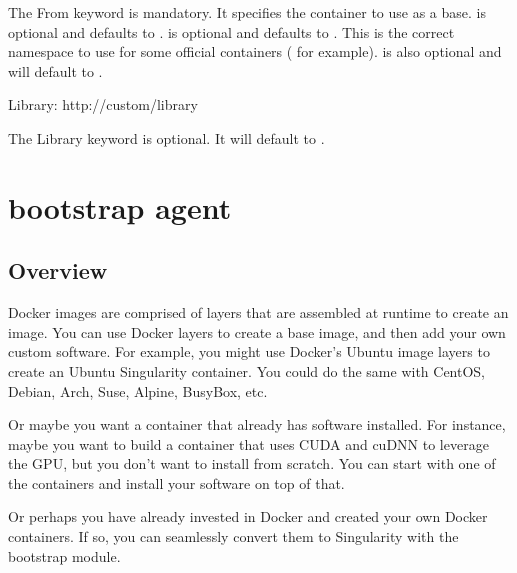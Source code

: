 \documentclass[letterpaper,10pt,english]{sphinxmanual}
\begin{document}
The From keyword is mandatory. It specifies the container to use as a base.
 is optional and defaults to .  is
optional and defaults to . This is the correct namespace to use for
some official containers ( for example).  is also optional and
will default to .

%
\begin{sphinxVerbatim}[commandchars=\\\{\}]
Library: http://custom/library
\end{sphinxVerbatim}

The Library keyword is optional. It will default to
.


\section{ bootstrap agent}
\label{\detokenize{appendix:docker-bootstrap-agent}}\label{\detokenize{appendix:build-docker-module}}

\subsection{Overview}
\label{\detokenize{appendix:sec-build-docker-module}}\label{\detokenize{appendix:id1}}
Docker images are comprised of layers that are assembled at runtime to create an
image. You can use Docker layers to create a base image, and then add your own
custom software. For example, you might use Docker’s Ubuntu image layers to
create an Ubuntu Singularity container. You could do the same with CentOS,
Debian, Arch, Suse, Alpine, BusyBox, etc.

Or maybe you want a container that already has software installed. For instance,
maybe you want to build a container that uses CUDA and cuDNN to leverage the
GPU, but you don’t want to install from scratch. You can start with one of the
 containers and install your software on top of that.

Or perhaps you have already invested in Docker and created your own Docker
containers. If so, you can seamlessly convert them to Singularity with the
 bootstrap module.
\end{document}

